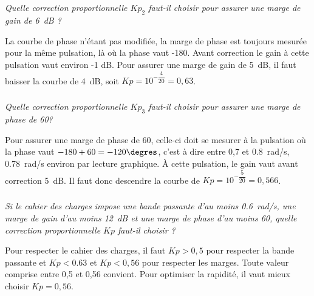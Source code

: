 \subparagraph{}\textit{Quelle correction proportionnelle $Kp_2$ faut-il choisir pour assurer une marge de gain de \SI{6}{dB} ?}
\ifprof
\begin{corrige}
La courbe de phase n'étant pas modifiée, la marge de phase est toujours mesurée pour la
même pulsation, là où la phase vaut -180\degres. Avant correction le gain à cette pulsation vaut
environ -1 dB. Pour assurer une marge de gain de \SI{5}{dB}, il faut baisser la courbe de \SI{4}{dB},
soit $Kp=10^{-\dfrac{4}{20}}=0,63$.
\end{corrige}
\else
\fi

\subparagraph{}\textit{Quelle correction proportionnelle $Kp_3$ faut-il choisir pour assurer une marge de phase de
60\degres ?}
\ifprof
\begin{corrige}
Pour assurer une marge de phase de 60\degres, celle-ci doit se mesurer à la pulsation où la phase
vaut $-180+60=-120\degres$, c'est à dire entre 0,7 et \SI{0,8}{rad/s}, \SI{0,78}{rad/s} environ par lecture
graphique. À cette pulsation, le gain vaut avant correction \SI{5}{dB}. Il faut donc descendre la
courbe de $Kp=10^{-\dfrac{5}{20}}=0,566$.
\end{corrige}
\else
\fi

\subparagraph{}\textit{Si le cahier des charges impose une bande passante d'au moins \SI{0,6}{rad/s}, une marge de gain
d'au moins \SI{12}{dB} et une marge de phase d'au moins 60\degres, quelle correction proportionnelle
$Kp$ faut-il choisir ?}
\ifprof
\begin{corrige}
Pour respecter le cahier des charges, il faut $Kp > 0,5$ pour respecter la bande passante et
$Kp<0.63$ et $Kp<0,56$ pour respecter les marges. Toute valeur comprise entre 0,5 et 0,56
convient. Pour optimiser la rapidité, il vaut mieux choisir $Kp=0,56$.
\end{corrige}
\else
\fi
